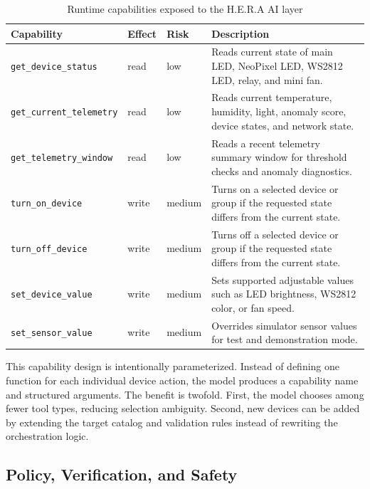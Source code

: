 \begin{table}[H]
    \centering
    \caption{Runtime capabilities exposed to the H.E.R.A AI layer}
    \label{tab:hera-capabilities}
    \renewcommand{\arraystretch}{1.16}
    \small
    \begin{tabularx}{\textwidth}{@{}p{3.2cm}p{1.7cm}p{1.7cm}X@{}}
        \toprule
        \textbf{Capability} & \textbf{Effect} & \textbf{Risk} & \textbf{Description} \\
        \midrule
        \texttt{get\_device\_status} & read & low & Reads current state of main LED, NeoPixel LED, WS2812 LED, relay, and mini fan. \\
        \texttt{get\_current\_telemetry} & read & low & Reads current temperature, humidity, light, anomaly score, device states, and network state. \\
        \texttt{get\_telemetry\_window} & read & low & Reads a recent telemetry summary window for threshold checks and anomaly diagnostics. \\
        \texttt{turn\_on\_device} & write & medium & Turns on a selected device or group if the requested state differs from the current state. \\
        \texttt{turn\_off\_device} & write & medium & Turns off a selected device or group if the requested state differs from the current state. \\
        \texttt{set\_device\_value} & write & medium & Sets supported adjustable values such as LED brightness, WS2812 color, or fan speed. \\
        \texttt{set\_sensor\_value} & write & medium & Overrides simulator sensor values for test and demonstration mode. \\
        \bottomrule
    \end{tabularx}
\end{table}

This capability design is intentionally parameterized. Instead of defining one function for each individual device action, the model produces a capability name and structured arguments. The benefit is twofold. First, the model chooses among fewer tool types, reducing selection ambiguity. Second, new devices can be added by extending the target catalog and validation rules instead of rewriting the orchestration logic.

\subsection{Policy, Verification, and Safety}

